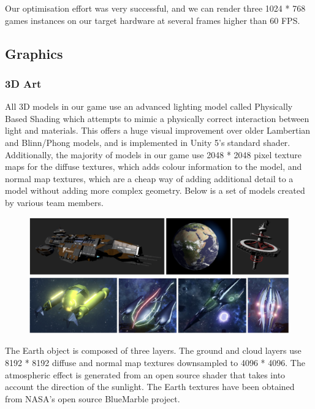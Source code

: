 \documentclass[a4paper,11pt]{article}
\begin{document}
Our optimisation effort was very successful, and we can render three 1024 * 768 games instances on our target hardware at several frames higher than 60 FPS.

\subsection{Graphics}

\subsubsection{3D Art}
All 3D models in our game use an advanced lighting model called Physically Based Shading which attempts to mimic a physically correct interaction between light and materials. This offers a huge visual improvement over older Lambertian and Blinn/Phong models, and is implemented in Unity 5’s standard shader.  Additionally, the majority of models in our game use 2048 * 2048 pixel texture maps for the diffuse textures, which adds colour information to the model, and normal map textures, which are a cheap way of adding additional detail to a model without adding more complex geometry. Below is a set of models created by various team members.

\begin{figure}[ht]
	\centering
	\includegraphics[width=\textwidth]{images/3DArt}
\end{figure}

The Earth object is composed of three layers. The ground and cloud layers use 8192 * 8192 diffuse and normal map textures downsampled to 4096 * 4096. The atmospheric effect is generated from an open source shader\cite{atmospheric_shader} that takes into account the direction of the sunlight. The Earth textures have been obtained from NASA’s open source BlueMarble\cite{blue_marble} project.
\end{document}
